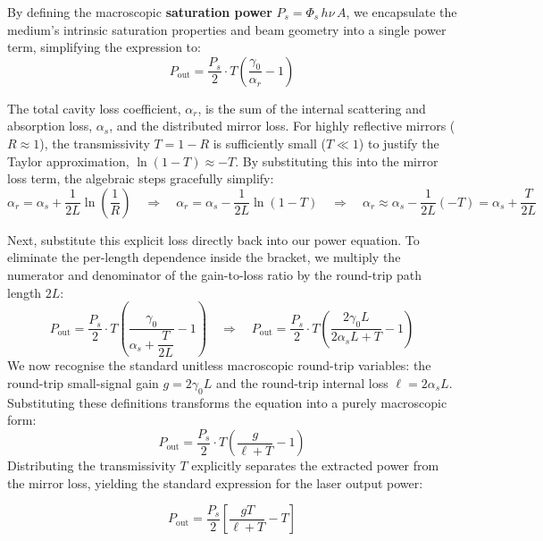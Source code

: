 By defining the macroscopic \textbf{saturation power} $P_s = \Phi_s\,h\nu\,A$, we encapsulate the medium's intrinsic saturation properties and beam geometry into a single power term, simplifying the expression to:
\begin{equation*}
    P_{\text{out}} = \frac{P_s}{2}\cdot T\left(\frac{\gamma_0}{\alpha_r} - 1\right)
\end{equation*}

The total cavity loss coefficient, $\alpha_r$, is the sum of the internal scattering and absorption loss, $\alpha_s$, and the distributed mirror loss. For highly reflective mirrors ($R \approx 1$), the transmissivity $T = 1 - R$ is sufficiently small ($T \ll 1$) to justify the Taylor approximation, $\ln(1-T) \approx -T$. By substituting this into the mirror loss term, the algebraic steps gracefully simplify:
\begin{equation*}
    \alpha_r = \alpha_s + \frac{1}{2L}\ln\left(\frac{1}{R}\right) \quad \Rightarrow \quad \alpha_r = \alpha_s - \frac{1}{2L}\ln(1-T) \quad \Rightarrow \quad \alpha_r \approx \alpha_s - \frac{1}{2L}(-T) = \alpha_s + \frac{T}{2L}
\end{equation*}

Next, substitute this explicit loss directly back into our power equation. To eliminate the per-length dependence inside the bracket, we multiply the numerator and denominator of the gain-to-loss ratio by the round-trip path length $2L$:
\begin{equation*}
    P_{\text{out}} = \frac{P_s}{2}\cdot T\left( \frac{\gamma_0}{\alpha_s + \dfrac{T}{2L}} - 1 \right) \quad \Rightarrow \quad P_{\text{out}} = \frac{P_s}{2}\cdot T\left( \frac{2\gamma_0 L}{2\alpha_s L + T} - 1 \right)
\end{equation*}
We now recognise the standard unitless macroscopic round-trip variables: the round-trip small-signal gain $g = 2\gamma_0 L$ and the round-trip internal loss $\ell = 2\alpha_s L$. Substituting these definitions transforms the equation into a purely macroscopic form:
\begin{equation*}
    P_{\text{out}} = \frac{P_s}{2}\cdot T\left( \frac{g}{\ell + T} - 1 \right)
\end{equation*}
Distributing the transmissivity $T$ explicitly separates the extracted power from the mirror loss, yielding the standard expression for the laser output power:
\begin{keyresult}
    \begin{equation}
        P_{\text{out}} = \frac{P_s}{2}\left[ \frac{gT}{\ell + T} - T \right]
    \end{equation}
\end{keyresult}

